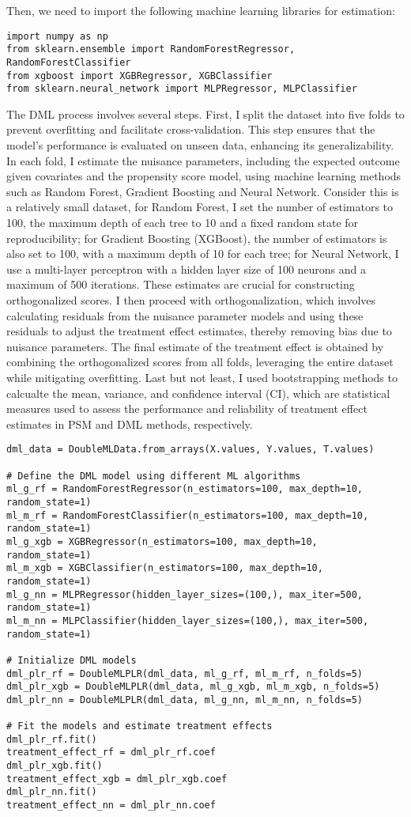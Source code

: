 \documentclass{article}
\begin{document}
\noindent Then, we need to import the following machine learning libraries for estimation:
\begin{verbatim}
import numpy as np
from sklearn.ensemble import RandomForestRegressor, RandomForestClassifier
from xgboost import XGBRegressor, XGBClassifier
from sklearn.neural_network import MLPRegressor, MLPClassifier
\end{verbatim}
The DML process involves several steps. First, I split the dataset into five folds to prevent overfitting and facilitate cross-validation. This step ensures that the model’s performance is evaluated on unseen data, enhancing its generalizability. In each fold, I estimate the nuisance parameters, including the expected outcome given covariates and the propensity score model, using machine learning methods such as Random Forest, Gradient Boosting and Neural Network. Consider this is a relatively small dataset, for Random Forest, I set the number of estimators to 100, the maximum depth of each tree to 10 and a fixed random state for reproducibility; for Gradient Boosting (XGBoost), the number of estimators is also set to 100, with a maximum depth of 10 for each tree; for Neural Network, I use a multi-layer perceptron with a hidden layer size of 100 neurons and a maximum of 500 iterations. These estimates are crucial for constructing orthogonalized scores. I then proceed with orthogonalization, which involves calculating residuals from the nuisance parameter models and using these residuals to adjust the treatment effect estimates, thereby removing bias due to nuisance parameters. The final estimate of the treatment effect is obtained by combining the orthogonalized scores from all folds, leveraging the entire dataset while mitigating overfitting. Last but not least, I used bootstrapping methods to calcualte the mean, variance, and confidence interval (CI), which are statistical measures used to assess the performance and reliability of treatment effect estimates in PSM and DML methods, respectively.

\begin{verbatim}
dml_data = DoubleMLData.from_arrays(X.values, Y.values, T.values)

# Define the DML model using different ML algorithms
ml_g_rf = RandomForestRegressor(n_estimators=100, max_depth=10, random_state=1)
ml_m_rf = RandomForestClassifier(n_estimators=100, max_depth=10, random_state=1)
ml_g_xgb = XGBRegressor(n_estimators=100, max_depth=10, random_state=1)
ml_m_xgb = XGBClassifier(n_estimators=100, max_depth=10, random_state=1)
ml_g_nn = MLPRegressor(hidden_layer_sizes=(100,), max_iter=500, random_state=1)
ml_m_nn = MLPClassifier(hidden_layer_sizes=(100,), max_iter=500, random_state=1)

# Initialize DML models
dml_plr_rf = DoubleMLPLR(dml_data, ml_g_rf, ml_m_rf, n_folds=5)
dml_plr_xgb = DoubleMLPLR(dml_data, ml_g_xgb, ml_m_xgb, n_folds=5)
dml_plr_nn = DoubleMLPLR(dml_data, ml_g_nn, ml_m_nn, n_folds=5)

# Fit the models and estimate treatment effects
dml_plr_rf.fit()
treatment_effect_rf = dml_plr_rf.coef
dml_plr_xgb.fit()
treatment_effect_xgb = dml_plr_xgb.coef
dml_plr_nn.fit()
treatment_effect_nn = dml_plr_nn.coef
\end{verbatim}
\end{document}
